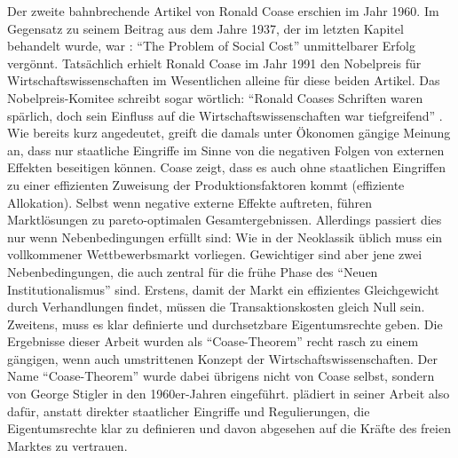 Der zweite bahnbrechende Artikel von Ronald Coase erschien im Jahr 1960. Im Gegensatz zu seinem Beitrag aus dem Jahre 1937, der im letzten Kapitel behandelt wurde, war \textcite{Coase1960}: "`The Problem of Social Cost"' unmittelbarer Erfolg vergönnt. Tatsächlich erhielt Ronald Coase im Jahr 1991 den Nobelpreis für Wirtschaftswissenschaften im Wesentlichen alleine für diese beiden Artikel. Das Nobelpreis-Komitee schreibt sogar wörtlich: "`Ronald Coases Schriften waren spärlich, doch sein Einfluss auf die Wirtschaftswissenschaften war tiefgreifend"' \parencite{Coase1991a}. Wie bereits kurz angedeutet, greift \textcite[S. 1]{Coase1960} die damals unter Ökonomen gängige Meinung an, dass nur staatliche Eingriffe im Sinne von \textcite{Pigou1920} die negativen Folgen von externen Effekten beseitigen können. Coase zeigt, dass es auch ohne staatlichen Eingriffen zu einer effizienten Zuweisung der Produktionsfaktoren kommt (effiziente Allokation). Selbst wenn negative externe Effekte auftreten, führen Marktlösungen zu pareto-optimalen Gesamtergebnissen. Allerdings passiert dies nur wenn Nebenbedingungen erfüllt sind: Wie in der Neoklassik üblich muss ein vollkommener Wettbewerbsmarkt vorliegen. Gewichtiger sind aber jene zwei Nebenbedingungen, die auch zentral für die frühe Phase des "`Neuen Institutionalismus"' sind. Erstens, damit der Markt ein effizientes Gleichgewicht durch Verhandlungen findet, müssen die Transaktionskosten gleich Null sein. Zweitens, muss es klar definierte und durchsetzbare Eigentumsrechte geben. Die Ergebnisse dieser Arbeit wurden als "`Coase-Theorem"' recht rasch zu einem gängigen, wenn auch umstrittenen Konzept der Wirtschaftswissenschaften. Der Name "`Coase-Theorem"' wurde dabei übrigens nicht von Coase selbst, sondern von George Stigler \parencite{Coase1991} in den 1960er-Jahren eingeführt. \textcite{Coase1960} plädiert in seiner Arbeit also dafür, anstatt direkter staatlicher Eingriffe und Regulierungen, die Eigentumsrechte klar zu definieren und davon abgesehen auf die Kräfte des freien Marktes zu vertrauen. 

